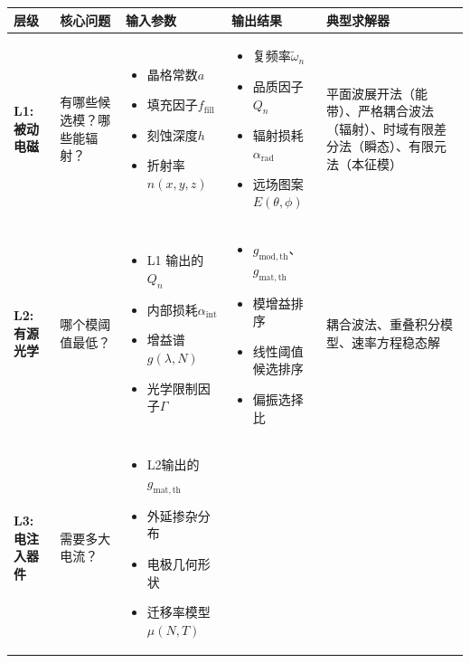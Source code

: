 
\small
\setlength{\tabcolsep}{3.5pt}
\begin{tabularx}{\textwidth}{@{}p{1.8cm}p{2.8cm}p{2.8cm}p{2.8cm}X@{}}
    \toprule
    \textbf{层级} & \textbf{核心问题} & \textbf{输入参数} & \textbf{输出结果} & \textbf{典型求解器} \\
    \midrule
    \textbf{L1: 被动电磁} & 有哪些候选模？哪些能辐射？ & 
    \begin{itemize}[nosep,leftmargin=*]\item 晶格常数$a$\item 填充因子$f_{\mathrm{fill}}$\item 刻蚀深度$h$\item 折射率$n(x,y,z)$\end{itemize} & 
    \begin{itemize}[nosep,leftmargin=*]\item 复频率$\tilde{\omega}_n$\item 品质因子$Q_n$\item 辐射损耗$\alpha_{\mathrm{rad}}$\item 远场图案$E(\theta,\phi)$\end{itemize} & 
    平面波展开法（能带）、严格耦合波法（辐射）、时域有限差分法（瞬态）、有限元法（本征模） \\
    \midrule
    \textbf{L2: 有源光学} & 哪个模阈值最低？ & 
    \begin{itemize}[nosep,leftmargin=*]\item L1 输出的$Q_n$\item 内部损耗$\alpha_{\mathrm{int}}$\item 增益谱$g(\lambda, N)$\item 光学限制因子$\Gamma$\end{itemize} & 
    \begin{itemize}[nosep,leftmargin=*]\item $g_{\mathrm{mod,th}}$、$g_{\mathrm{mat,th}}$\item 模增益排序\item 线性阈值候选排序\item 偏振选择比\end{itemize} & 
    耦合波法、重叠积分模型、速率方程稳态解 \\
    \midrule
    \textbf{L3: 电注入器件} & 需要多大电流？ & 
    \begin{itemize}[nosep,leftmargin=*]\item L2输出的$g_{\mathrm{mat,th}}$\item 外延掺杂分布\item 电极几何形状\item 迁移率模型$\mu(N,T)$\end{itemize} & 

\end{tabularx}
